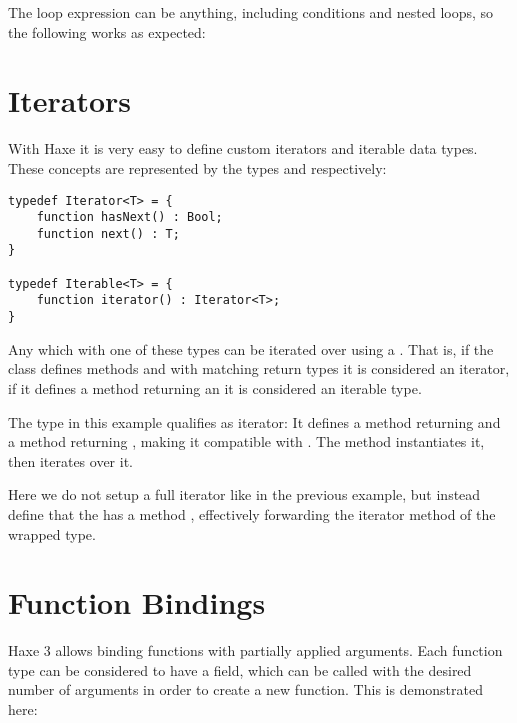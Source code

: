The loop expression can be anything, including conditions and nested loops, so the following works as expected:



\section{Iterators}
\label{lf-iterators}

With Haxe it is very easy to define custom iterators and iterable data types. These concepts are represented by the types  and  respectively:

\begin{lstlisting}
typedef Iterator<T> = {
	function hasNext() : Bool;
	function next() : T;
}

typedef Iterable<T> = {
	function iterator() : Iterator<T>;
}
\end{lstlisting}

Any  which  with one of these types can be iterated over using a . That is, if the class defines methods  and  with matching return types it is considered an iterator, if it defines a method  returning an  it is considered an iterable type.


The type  in this example qualifies as iterator: It defines a method  returning  and a method  returning , making it compatible with . The  method instantiates it, then iterates over it.


Here we do not setup a full iterator like in the previous example, but instead define that the  has a method , effectively forwarding the iterator method of the wrapped  type. 



\section{Function Bindings}
\label{lf-function-bindings}

Haxe 3 allows binding functions with partially applied arguments. Each function type can be considered to have a  field, which can be called with the desired number of arguments in order to create a new function. This is demonstrated here:

